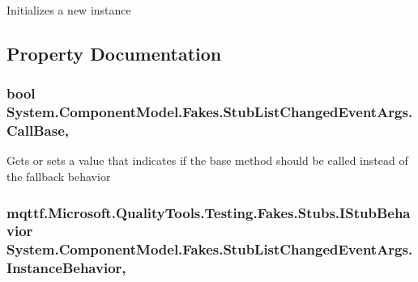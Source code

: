 Initializes a new instance



\subsection{Property Documentation}
\hypertarget{class_system_1_1_component_model_1_1_fakes_1_1_stub_list_changed_event_args_ab76c6421f170a0142ae75a001e43779b}{
\subsubsection[{Call\-Base}]{\setlength{\rightskip}{0pt plus 5cm}bool System.\-Component\-Model.\-Fakes.\-Stub\-List\-Changed\-Event\-Args.\-Call\-Base\hspace{0.3cm}{\ttfamily [get]}, {\ttfamily [set]}}}\label{class_system_1_1_component_model_1_1_fakes_1_1_stub_list_changed_event_args_ab76c6421f170a0142ae75a001e43779b}


Gets or sets a value that indicates if the base method should be called instead of the fallback behavior

\hypertarget{class_system_1_1_component_model_1_1_fakes_1_1_stub_list_changed_event_args_ab4fbaa4509e0ac457b439e455ae3cb6e}{
\subsubsection[{Instance\-Behavior}]{\setlength{\rightskip}{0pt plus 5cm}mqttf.\-Microsoft.\-Quality\-Tools.\-Testing.\-Fakes.\-Stubs.\-I\-Stub\-Behavior System.\-Component\-Model.\-Fakes.\-Stub\-List\-Changed\-Event\-Args.\-Instance\-Behavior\hspace{0.3cm}{\ttfamily [get]}, {\ttfamily [set]}}}\label{class_system_1_1_component_model_1_1_fakes_1_1_stub_list_changed_event_args_ab4fbaa4509e0ac457b439e455ae3cb6e}


